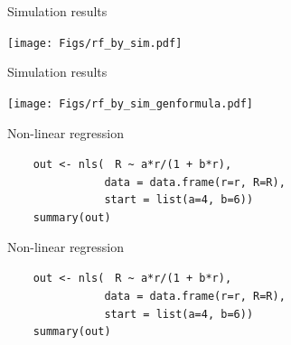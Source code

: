 \documentclass[12pt]{article}
\newcommand{\headsize}{\fontsize{35}{35} \selectfont}
\newcommand{\textsize}{\fontsize{30}{35} \selectfont}
\begin{document}
{\headsize \color{myyellow}
\hfill \begin{minipage}{5.75in}
\centering
Simulation results
\end{minipage}

\vfill

\centerline{\texttt{[image: Figs/rf\_by\_sim.pdf]}}

\vspace{15mm}

\newpage


\headsize \color{myyellow}
\hfill \begin{minipage}{5.75in}
\centering
Simulation results
\end{minipage}

\vfill

\centerline{\texttt{[image: Figs/rf\_by\_sim\_genformula.pdf]}}

\vspace{15mm}

\newpage

\headsize \color{myyellow}
\hfill \begin{minipage}{5.75in}
\centering
Non-linear regression
\end{minipage}


\vspace{30mm}

\textsize
{\color{myblue}
\verb|    out <- nls(| {\tt \color{mypink} R \verb|~| a*r/(1 + b*r)}\verb|,| \\
\verb|               data = data.frame(r=r, R=R),| \\
\verb|               start = list(a=4, b=6))| \\
\verb|    summary(out)|
}

\newpage
\addtocounter{page}{-1}

\headsize \color{myyellow}
\hfill \begin{minipage}{5.75in}
\centering
Non-linear regression
\end{minipage}


\vspace{30mm}

\textsize
{\color{myblue}
\verb|    out <- nls(| {\tt \color{mypink} R \verb|~| a*r/(1 + b*r)}\verb|,| \\
\verb|               data = data.frame(r=r, R=R),| \\
\verb|               start = list(a=4, b=6))| \\
\verb|    summary(out)|
}

}
\end{document}
